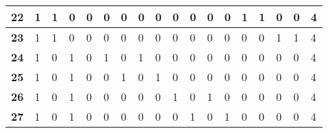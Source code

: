 \begin{table}[]
{\begin{tabular}{|P{0.6cm}|P{0.65cm}|P{0.65cm}|P{0.65cm}|P{0.65cm}|P{0.65cm}|P{0.65cm}|P{0.65cm}|P{0.65cm}|P{0.65cm}|P{0.65cm}|P{0.65cm}|P{0.65cm}|P{0.65cm}|P{0.65cm}|P{0.65cm}|P{0.65cm}|P{2.9cm}|}
\textbf{22}                        & 1                     & 1                     & 0                     & 0                     & 0                     & 0                     & 0                     & 0                     & 0                     & 0                     & 0                     & 0                     & 1                     & 1                     & 0                     & 0                     & 4                     \\ \hline
\textbf{23}                        & 1                     & 1                     & 0                     & 0                     & 0                     & 0                     & 0                     & 0                     & 0                     & 0                     & 0                     & 0                     & 0                     & 0                     & 1                     & 1                     & 4                     \\ \hline
\textbf{24}                        & 1                     & 0                     & 1                     & 0                     & 1                     & 0                     & 1                     & 0                     & 0                     & 0                     & 0                     & 0                     & 0                     & 0                     & 0                     & 0                     & 4                     \\ \hline
\textbf{25}                        & 1                     & 0                     & 1                     & 0                     & 0                     & 1                     & 0                     & 1                     & 0                     & 0                     & 0                     & 0                     & 0                     & 0                     & 0                     & 0                     & 4                     \\ \hline
\textbf{26}                        & 1                     & 0                     & 1                     & 0                     & 0                     & 0                     & 0                     & 0                     & 1                     & 0                     & 1                     & 0                     & 0                     & 0                     & 0                     & 0                     & 4                     \\ \hline
\textbf{27}                        & 1                     & 0                     & 1                     & 0                     & 0                     & 0                     & 0                     & 0                     & 0                     & 1                     & 0                     & 1                     & 0                     & 0                     & 0                     & 0                     & 4                     \\ \hline

\end{tabular}}
\end{table}

